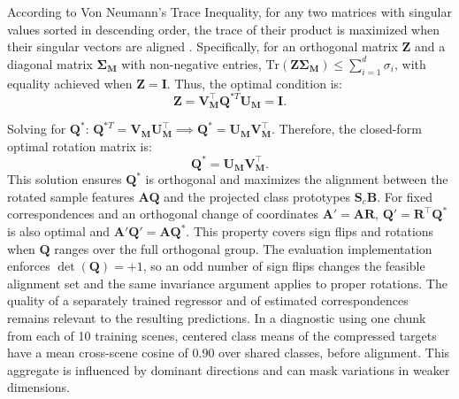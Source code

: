 According to Von Neumann's Trace Inequality, for any two matrices with singular values sorted in descending order, the trace of their product is maximized when their singular vectors are aligned \cite{vonNeumann1937}. Specifically, for an orthogonal matrix $\mathbf{Z}$ and a diagonal matrix $\mathbf{\Sigma}_{\mathbf{M}}$ with non-negative entries, $\text{Tr}(\mathbf{Z} \mathbf{\Sigma}_{\mathbf{M}}) \leq \sum_{i=1}^d \sigma_i$, with equality achieved when $\mathbf{Z} = \mathbf{I}$. Thus, the optimal condition is:
\begin{equation}
    \mathbf{Z} = \mathbf{V}_{\mathbf{M}}^\top \mathbf{Q}^{*T} \mathbf{U}_{\mathbf{M}} = \mathbf{I}.
\end{equation}

Solving for $\mathbf{Q}^*$: $\mathbf{Q}^{*T} = \mathbf{V}_{\mathbf{M}} \mathbf{U}_{\mathbf{M}}^\top \implies \mathbf{Q}^* = \mathbf{U}_{\mathbf{M}} \mathbf{V}_{\mathbf{M}}^\top.$
Therefore, the closed-form optimal rotation matrix is:
\begin{equation}
    \mathbf{Q}^* = \mathbf{U}_{\mathbf{M}} \mathbf{V}_{\mathbf{M}}^\top.
    \label{eq:optimal_Q}
\end{equation}
This solution ensures $\mathbf{Q}^*$ is orthogonal and maximizes the alignment between the rotated sample features $\mathbf{A}\mathbf{Q}$ and the projected class prototypes $\mathbf{S}_c \mathbf{B}$. For fixed correspondences and an orthogonal change of coordinates $\mathbf{A}' = \mathbf{A}\mathbf{R}$, $\mathbf{Q}' = \mathbf{R}^\top\mathbf{Q}^*$ is also optimal and $\mathbf{A}'\mathbf{Q}' = \mathbf{A}\mathbf{Q}^*$. This property covers sign flips and rotations when $\mathbf{Q}$ ranges over the full orthogonal group. The evaluation implementation enforces $\det(\mathbf{Q})=+1$, so an odd number of sign flips changes the feasible alignment set and the same invariance argument applies to proper rotations. The quality of a separately trained regressor and of estimated correspondences remains relevant to the resulting predictions. In a diagnostic using one chunk from each of 10 training scenes, centered class means of the compressed targets have a mean cross-scene cosine of 0.90 over shared classes, before alignment. This aggregate is influenced by dominant directions and can mask variations in weaker dimensions.

